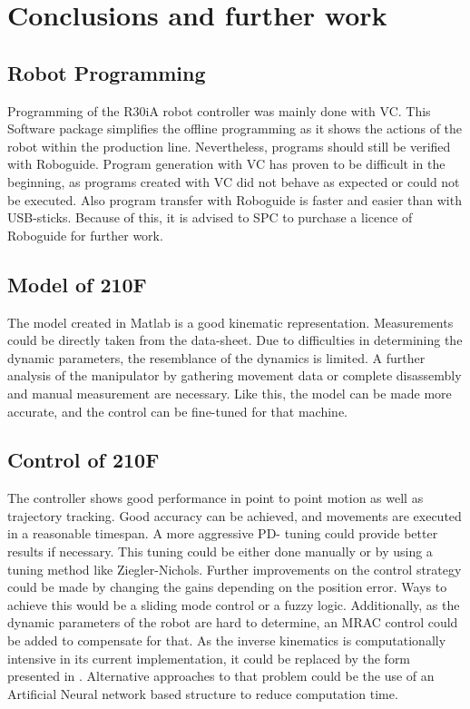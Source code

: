 \chapter{Conclusions and further work}

\section{Robot Programming}
Programming of the R30iA robot controller was mainly done with \ac{VC}. This Software package simplifies the offline programming as it shows the actions of the robot within the production line. Nevertheless, programs should still be verified with Roboguide. Program generation with \ac{VC} has proven to be difficult in the beginning, as programs created with \ac{VC} did not behave as expected or could not be executed. Also program transfer with Roboguide is faster and easier than with USB-sticks. Because of this, it is advised to \ac{SPC} to purchase a licence of Roboguide for further work. 

\section{Model of 210F}
The model created in Matlab is a good kinematic representation. Measurements could be directly taken from the data-sheet. Due to difficulties in determining the dynamic parameters, the resemblance of the dynamics is limited.   A further analysis of the manipulator by gathering movement data or complete disassembly and manual measurement are necessary. Like this, the model can be made more accurate, and the control can be fine-tuned for that machine.\\

\section{Control of 210F}
The controller shows good performance in point to point motion as well as trajectory tracking. Good accuracy can be achieved, and movements are executed in a reasonable timespan. A more aggressive PD- tuning could provide better results if necessary. This tuning could be either done manually or by using a tuning method like Ziegler-Nichols.
Further improvements on the control strategy could be made by changing the gains depending on the position error. Ways to achieve this would be a sliding mode control or a fuzzy logic. Additionally, as the dynamic parameters of the robot are hard to determine, an \ac{MRAC} control could be added to compensate for that. 
As the inverse kinematics is computationally intensive in its current implementation, it could be replaced by the form presented in . Alternative approaches to that problem could be the use of an Artificial Neural network based structure to reduce computation time. 

